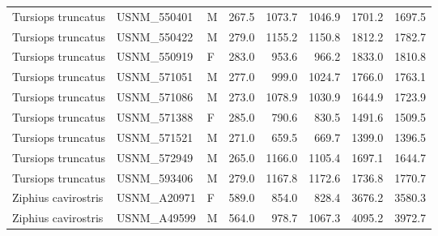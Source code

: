\begin{table}[ht]
\begin{tabular}{lllrrrrr}
  Tursiops truncatus & USNM\_550401 & M & 267.5 & 1073.7 & 1046.9 & 1701.2 & 1697.5 \\ 
  Tursiops truncatus & USNM\_550422 & M & 279.0 & 1155.2 & 1150.8 & 1812.2 & 1782.7 \\ 
  Tursiops truncatus & USNM\_550919 & F & 283.0 & 953.6 & 966.2 & 1833.0 & 1810.8 \\ 
  Tursiops truncatus & USNM\_571051 & M & 277.0 & 999.0 & 1024.7 & 1766.0 & 1763.1 \\ 
  Tursiops truncatus & USNM\_571086 & M & 273.0 & 1078.9 & 1030.9 & 1644.9 & 1723.9 \\ 
  Tursiops truncatus & USNM\_571388 & F & 285.0 & 790.6 & 830.5 & 1491.6 & 1509.5 \\ 
  Tursiops truncatus & USNM\_571521 & M & 271.0 & 659.5 & 669.7 & 1399.0 & 1396.5 \\ 
  Tursiops truncatus & USNM\_572949 & M & 265.0 & 1166.0 & 1105.4 & 1697.1 & 1644.7 \\ 
  Tursiops truncatus & USNM\_593406 & M & 279.0 & 1167.8 & 1172.6 & 1736.8 & 1770.7 \\ 
  Ziphius cavirostris & USNM\_A20971 & F & 589.0 & 854.0 & 828.4 & 3676.2 & 3580.3 \\ 
  Ziphius cavirostris & USNM\_A49599 & M & 564.0 & 978.7 & 1067.3 & 4095.2 & 3972.7 \\ 
   \hline
\end{tabular}
\end{table}
